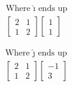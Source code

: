 \documentclass{article}
\begin{document}
\begin{center}
\begin{minipage}{0.25\textwidth}
\begin{align*}
\text{Where }\hat\imath \text{ ends up} \\
\begin{bmatrix} 2 & 1 \\ 1 & 2 \end{bmatrix} 
\begin{bmatrix}
1  \\ 1 
\end{bmatrix}
\end{align*}
\end{minipage}
\begin{minipage}{0.35\textwidth}
\begin{align*}
\text{Where }\hat\jmath \text{ ends up} \\
\begin{bmatrix} 2 & 1 \\ 1 & 2 \end{bmatrix} 
\begin{bmatrix}
-1 \\ 3 
\end{bmatrix}
\end{align*}
\end{minipage}
\end{center}
\end{document}
